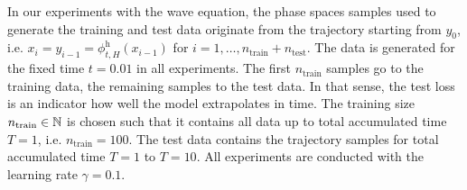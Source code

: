 \documentclass[twoside,a4paper]{article}
\begin{document}
In our experiments with the wave equation, the phase spaces samples
used to generate the training and test data originate from the trajectory
starting from $y_0$, i.e. $x_i = y_{i-1} = \phi^{\text{h}}_{t,H}(x_{i-1})$ for
$i = 1, \dots, n_{\text{train}} + n_{\text{test}}$. The data is generated
for the fixed time $t = 0.01$ in all experiments. 
The first $n_{\text{train}}$ samples go to the training data, the remaining samples
to the test data. In that sense, the test loss is an indicator how well 
the model extrapolates in time. The training size
$n_{\text{train}} \in \mathbb{N}$ is chosen such that it contains all data up to
total accumulated time $T=1$, i.e. $n_{\text{train}} = 100$. The test data
contains the trajectory samples for total accumulated time $T=1$ to $T=10$.
All experiments are conducted with the learning rate $\gamma = 0.1$.
\end{document}
